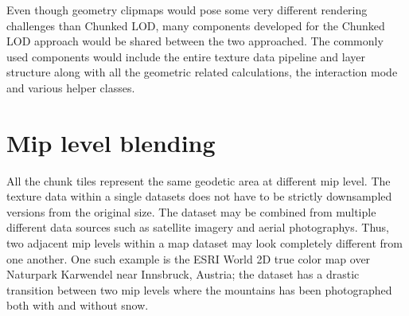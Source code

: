 Even though geometry clipmaps would pose some very different rendering challenges than Chunked LOD, many components developed for the Chunked LOD approach would be shared between the two approached. 
The commonly used components would include the entire texture data pipeline and layer structure along with all the geometric related calculations, the interaction mode and various helper classes.

\section{Mip level blending}
All the chunk tiles represent the same geodetic area at different mip level. 
The texture data within a single datasets does not have to be strictly downsampled versions from the original size. 
The dataset may be combined from multiple different data sources such as satellite imagery and aerial photographys. 
Thus, two adjacent mip levels within a map dataset may look completely different from one another. 
One such example is the ESRI World 2D true color map over Naturpark Karwendel near Innsbruck, Austria; the dataset has a drastic transition between two mip levels where the mountains has been photographed both with and without snow.